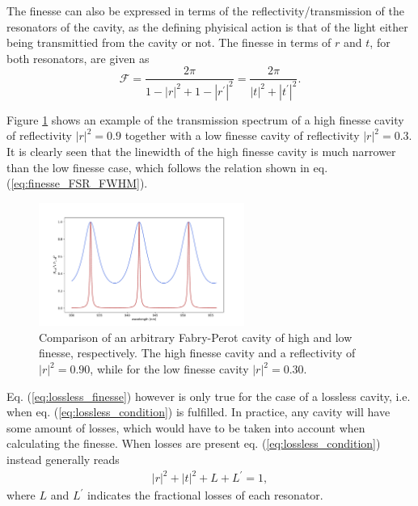 The finesse can also be expressed in terms of the reflectivity/transmission of the resonators of the cavity, as the defining phyisical action is that of the light either being transmittied from the cavity or not. The finesse in terms of $r$ and $t$, for both resonators, are given as
\begin{equation}
    \mathcal{F} = \frac{2 \pi}{1 - |r|^2 + 1 - |r^{\prime}|^2} = \frac{2 \pi}{|t|^2+|t^{\prime}|^2}.
    \label{eq:lossless_finesse}
\end{equation}

Figure \ref{fig:fabry_perot_trans} shows an example of the transmission spectrum of a high finesse cavity of reflectivity $|r|^2 = 0.9$ together with a low finesse cavity of reflectivity $|r|^2 = 0.3$. It is clearly seen that the linewidth of the high finesse cavity is much narrower than the low finesse case, which follows the relation shown in eq. (\ref{eq:finesse_FSR_FWHM}).

\begin{figure}[h!]
    \centering
    \includegraphics[width=0.6\textwidth]{figures/fabry_perot_high_and_low_finesse.pdf}
    \caption{Comparison of an arbitrary Fabry-Perot cavity of high and low finesse, respectively. The high finesse cavity and a reflectivity of $|r|^2 = 0.90$, while for the low finesse cavity $|r|^2 = 0.30$.}
    \label{fig:fabry_perot_trans}
\end{figure}


Eq. (\ref{eq:lossless_finesse}) however is only true for the case of a lossless cavity, i.e. when eq. (\ref{eq:lossless_condition}) is fulfilled. In practice, any cavity will have some amount of losses, which would have to be taken into account when calculating the finesse. When losses are present eq. (\ref{eq:lossless_condition}) instead generally reads
\begin{eqnarray}
    |r|^2 + |t|^2 + L + L^{\prime} = 1,
\end{eqnarray}
where $L$ and $L^{\prime}$ indicates the fractional losses of each resonator.

